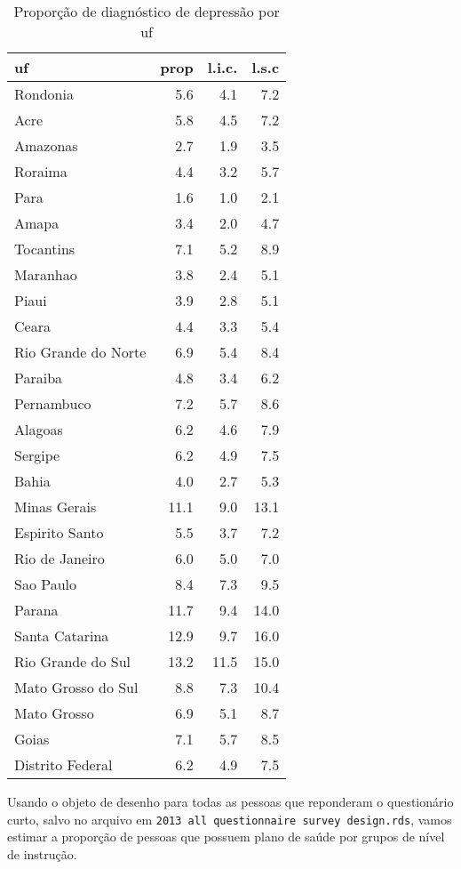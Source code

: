 \documentclass[]{book}
\theoremstyle{definition}
\theoremstyle{definition}
\theoremstyle{remark}
\begin{document}
\begin{table}

\caption{\label{tab:unnamed-chunk-54}Proporção de diagnóstico de depressão por uf}
\centering
\begin{tabular}[t]{lrrr}
\toprule
uf & prop & l.i.c. & l.s.c\\
\midrule
Rondonia & 5.6 & 4.1 & 7.2\\
Acre & 5.8 & 4.5 & 7.2\\
Amazonas & 2.7 & 1.9 & 3.5\\
Roraima & 4.4 & 3.2 & 5.7\\
Para & 1.6 & 1.0 & 2.1\\
\addlinespace
Amapa & 3.4 & 2.0 & 4.7\\
Tocantins & 7.1 & 5.2 & 8.9\\
Maranhao & 3.8 & 2.4 & 5.1\\
Piaui & 3.9 & 2.8 & 5.1\\
Ceara & 4.4 & 3.3 & 5.4\\
\addlinespace
Rio Grande do Norte & 6.9 & 5.4 & 8.4\\
Paraiba & 4.8 & 3.4 & 6.2\\
Pernambuco & 7.2 & 5.7 & 8.6\\
Alagoas & 6.2 & 4.6 & 7.9\\
Sergipe & 6.2 & 4.9 & 7.5\\
\addlinespace
Bahia & 4.0 & 2.7 & 5.3\\
Minas Gerais & 11.1 & 9.0 & 13.1\\
Espirito Santo & 5.5 & 3.7 & 7.2\\
Rio de Janeiro & 6.0 & 5.0 & 7.0\\
Sao Paulo & 8.4 & 7.3 & 9.5\\
\addlinespace
Parana & 11.7 & 9.4 & 14.0\\
Santa Catarina & 12.9 & 9.7 & 16.0\\
Rio Grande do Sul & 13.2 & 11.5 & 15.0\\
Mato Grosso do Sul & 8.8 & 7.3 & 10.4\\
Mato Grosso & 6.9 & 5.1 & 8.7\\
\addlinespace
Goias & 7.1 & 5.7 & 8.5\\
Distrito Federal & 6.2 & 4.9 & 7.5\\
\bottomrule
\end{tabular}
\end{table}

Usando o objeto de desenho para todas as pessoas que reponderam o
questionário curto, salvo no arquivo em
\texttt{2013\ all\ questionnaire\ survey\ design.rds}, vamos estimar a
proporção de pessoas que possuem plano de saúde por grupos de nível de
instrução.
\end{document}
